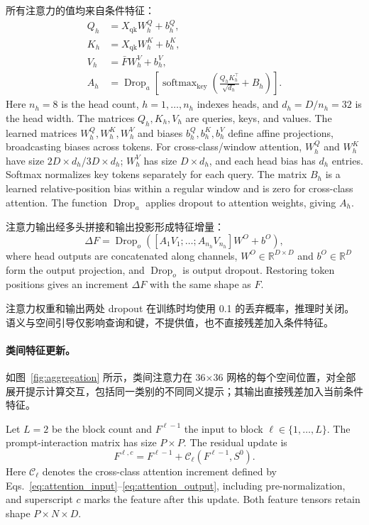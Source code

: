 所有注意力的值均来自条件特征：
\begin{equation}
\begin{aligned}
 Q_h &= X_{\mathrm{qk}}W_h^Q+b_h^Q,\\
 K_h &= X_{\mathrm{qk}}W_h^K+b_h^K,\\
 V_h &= \bar F W_h^V+b_h^V,\\
 A_h &= \operatorname{Drop}_a\!\left[
 \operatorname{softmax}_{\mathrm{key}}\!\left(
 \frac{Q_hK_h^\top}{\sqrt{d_h}}+B_h
 \right)\right].
\end{aligned}
\label{eq:attention_heads}
\end{equation}
Here $n_h=8$ is the head count, $h=1,\ldots,n_h$ indexes heads, and $d_h=D/n_h=32$ is the head width. The matrices $Q_h,K_h,V_h$ are queries, keys, and values. The learned matrices $W_h^Q,W_h^K,W_h^V$ and biases $b_h^Q,b_h^K,b_h^V$ define affine projections, broadcasting biases across tokens. For cross-class/window attention, $W_h^Q$ and $W_h^K$ have size $2D\times d_h$/$3D\times d_h$; $W_h^V$ has size $D\times d_h$, and each head bias has $d_h$ entries. Softmax normalizes key tokens separately for each query. The matrix $B_h$ is a learned relative-position bias within a regular window and is zero for cross-class attention. The function $\operatorname{Drop}_a$ applies dropout to attention weights, giving $A_h$.

注意力输出经多头拼接和输出投影形成特征增量：
\begin{equation}
 \Delta F=\operatorname{Drop}_o\!\left(
 [A_1V_1;\ldots;A_{n_h}V_{n_h}]W^O+b^O
 \right),
 \label{eq:attention_output}
\end{equation}
where head outputs are concatenated along channels, $W^O\in\mathbb R^{D\times D}$ and $b^O\in\mathbb R^D$ form the output projection, and $\operatorname{Drop}_o$ is output dropout. Restoring token positions gives an increment $\Delta F$ with the same shape as $F$.

注意力权重和输出两处 dropout 在训练时均使用 0.1 的丢弃概率，推理时关闭。语义与空间引导仅影响查询和键，不提供值，也不直接残差加入条件特征。

\paragraph{类间特征更新。}
如图~\ref{fig:aggregation} 所示，类间注意力在 36×36 网格的每个空间位置，对全部展开提示计算交互，包括同一类别的不同同义提示；其输出直接残差加入当前条件特征。

Let $L=2$ be the block count and $F^{\ell-1}$ the input to block $\ell\in\{1,\ldots,L\}$. The prompt-interaction matrix has size $P\times P$. The residual update is
\begin{equation}
 F^{\ell,c}=F^{\ell-1}+\mathcal C_\ell(F^{\ell-1},S^0).
 \label{eq:cross_class_update}
\end{equation}
Here $\mathcal C_\ell$ denotes the cross-class attention increment defined by Eqs.~\eqref{eq:attention_input}--\eqref{eq:attention_output}, including pre-normalization, and superscript $c$ marks the feature after this update. Both feature tensors retain shape $P\times N\times D$.


